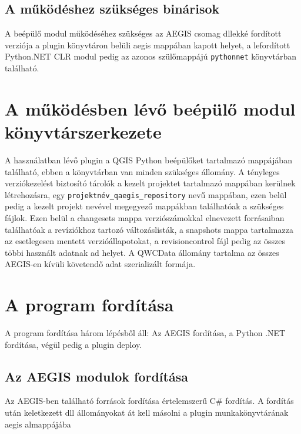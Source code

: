 \subsection{A működéshez szükséges binárisok}
A beépülő modul működéséhez szükséges az AEGIS csomag dllekké fordított verziója a plugin könyvtáron belüli aegis mappában kapott helyet, a lefordított Python.NET CLR modul pedig az azonos szülőmappájú \texttt{pythonnet} könyvtárban található.

\section{A működésben lévő beépülő modul könyvtárszerkezete}
A használatban lévő plugin a QGIS Python beépülőket tartalmazó mappájában található, ebben a könyvtárban van minden szükséges állomány. A tényleges verziókezelést biztosító tárolók a kezelt projektet tartalmazó mappában kerülnek létrehozásra, egy \texttt{projektnév\_qaegis\_repository} nevű mappában, ezen belül pedig a kezelt projekt nevével megegyező mappákban találhatóak a szükséges fájlok. Ezen belül a changesets mappa verziószámokkal elnevezett forrásaiban találhatóak a revíziókhoz tartozó változáslisták, a snapshots mappa tartalmazza az esetlegesen mentett verzióállapotokat, a revisioncontrol fájl pedig az összes többi használt adatnak ad helyet. A QWCData állomány tartalma az összes AEGIS-en kívüli követendő adat szerializált formája.

\section{A program fordítása}
A program fordítása három lépésből áll: Az AEGIS fordítása, a Python .NET fordítása, végül pedig a plugin deploy.
\subsection{Az AEGIS modulok fordítása}
Az AEGIS-ben található források fordítása értelemszerű C\# fordítás. A fordítás után keletkezett dll állományokat át kell másolni a plugin munkakönyvtárának aegis almappájába
